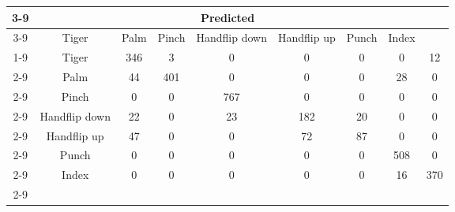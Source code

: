 \documentclass{standalone}
\begin{document}
 
 \begin{tabular}{|c |c |c |c |c |c |c |c |c |}
\cline{3-9}\multicolumn{2}{c|}{} & \multicolumn{7}{c|}{Predicted} \\ 
\cline{3-9} \multicolumn{2}{c |}{ } & Tiger & Palm & Pinch & Handflip down & Handflip up & Punch & Index\\ 
\cline{1-9}\multirow{7}{*}{\rotatebox[origin=c]{90}{Actual}} & Tiger & 346 & 3 & 0 & 0 & 0 & 0 & 12\\ 
 \cline{2-9} & Palm & 44 & 401 & 0 & 0 & 0 & 28 & 0\\ 
 \cline{2-9} & Pinch & 0 & 0 & 767 & 0 & 0 & 0 & 0\\ 
 \cline{2-9} & Handflip down & 22 & 0 & 23 & 182 & 20 & 0 & 0\\ 
 \cline{2-9} & Handflip up & 47 & 0 & 0 & 72 & 87 & 0 & 0\\ 
 \cline{2-9} & Punch & 0 & 0 & 0 & 0 & 0 & 508 & 0\\ 
 \cline{2-9} & Index & 0 & 0 & 0 & 0 & 0 & 16 & 370\\ 
 \cline{2-9}\hline \end{tabular}
 
\end{document}
